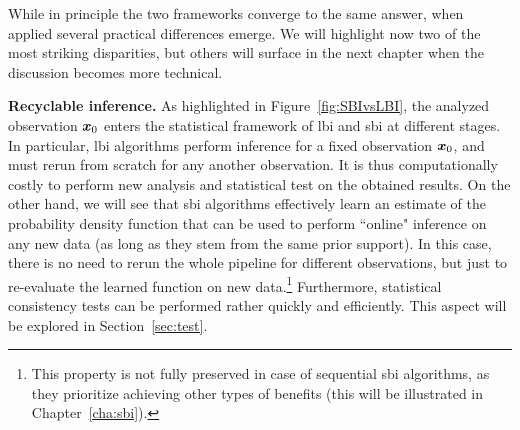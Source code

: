 

While in principle the two frameworks converge to the same answer, when applied several practical differences emerge. We will highlight now two of the most striking disparities, but others will surface in the next chapter when the discussion becomes more technical.

\noindent \textbf{Recyclable inference.} As highlighted in Figure~\ref{fig:SBIvsLBI}, the analyzed observation $\bm{x}_0$ enters the statistical framework of \gls*{lbi} and \gls*{sbi} at different stages. In particular, \gls*{lbi} algorithms perform inference for a fixed observation $\bm{x}_0$, and must rerun from scratch for any another observation. It is thus computationally costly to perform new analysis and statistical test on the obtained results. On the other hand, we will see that \gls*{sbi} algorithms effectively learn an estimate of the probability density function that can be used to perform ``online" inference on any new data (as long as they stem from the same prior support). In this case, there is no need to rerun the whole pipeline for different observations, but just to re-evaluate the learned function on new data.\footnote{This property is not fully preserved in case of sequential \gls*{sbi} algorithms, as they prioritize achieving other types of benefits (this will be illustrated in Chapter~\ref{cha:sbi}).} Furthermore, statistical consistency tests can be performed rather quickly and efficiently. This aspect will be explored in Section~\ref{sec:test}.

